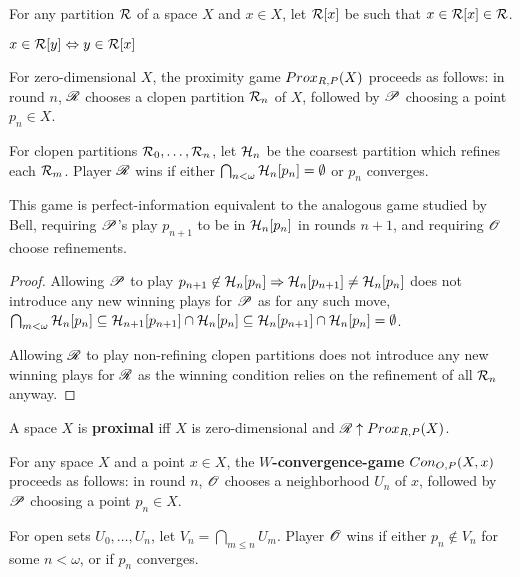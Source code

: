 



\begin{definition}
  For any partition $\mathcal{R}$ of a space $X$ and $x\in X$, let $\mathcal{R}[x]$ be such that $x\in\mathcal{R}[x]\in\mathcal{R}$.
\end{definition}

\begin{proposition}
  $x\in \mathcal{R}[y] \Leftrightarrow y\in \mathcal{R}[x]$
\end{proposition}

\begin{definition}
  For zero-dimensional $X$, the proximity game $Prox_{R,P}(X)$ proceeds as follows: in round $n$, $\mathscr{R}$ chooses a clopen partition $\mathcal{R}_n$ of $X$, followed by $\mathscr{P}$ choosing a point $p_n\in X$.

  For clopen partitions $\mathcal{R}_0,\dots,\mathcal{R}_n$, let $\mathcal{H}_n$ be the coarsest partition which refines each $\mathcal{R}_m$. Player $\mathscr{R}$ wins if either $\bigcap_{n<\omega} \mathcal{H}_n[p_n] = \emptyset$ or $p_n$ converges.
\end{definition}

\begin{proposition}
  This game is perfect-information equivalent to the analogous game studied by Bell, requiring $\mathscr{P}$'s play $p_{n+1}$ to be in $\mathcal{H}_n[p_n]$ in rounds $n+1$, and requiring $\mathscr{O}$ choose refinements.
\end{proposition}

\begin{proof}
  Allowing $\mathscr{P}$ to play $p_{n+1}\not\in \mathcal{H}_n[p_n]\Rightarrow \mathcal{H}_n[p_{n+1}]\not=\mathcal{H}_n[p_n]$ does not introduce any new winning plays for $\mathscr{P}$ as for any such move, $\bigcap_{m<\omega}\mathcal{H}_n[p_n]\subseteq \mathcal{H}_{n+1}[p_{n+1}]\cap \mathcal{H}_n[p_n]\subseteq \mathcal{H}_n[p_{n+1}]\cap \mathcal{H}_n[p_n]=\emptyset$.

  Allowing $\mathscr{R}$ to play non-refining clopen partitions does not introduce any new winning plays for $\mathscr{R}$ as the winning condition relies on the refinement of all $\mathcal{R}_n$ anyway.
\end{proof}

\begin{definition}
  A space $X$ is \textbf{proximal} iff $X$ is zero-dimensional and $\mathscr{R}\uparrow Prox_{R,P}(X)$.
\end{definition}

\begin{definition}
  For any space $X$ and a point $x\in X$, the \textbf{$W$-convergence-game} $Con_{O,P}(X,x)$ proceeds as follows: in round $n$, $\mathscr{O}$ chooses a neighborhood $U_n$ of $x$, followed by $\mathscr{P}$ choosing a point $p_n\in X$.

  For open sets $U_0,\dots,U_n$, let $V_n=\bigcap_{m\leq n} U_m$. Player $\mathscr{O}$ wins if either $p_n\not\in V_n$ for some $n<\omega$, or if $p_n$ converges.
\end{definition}

